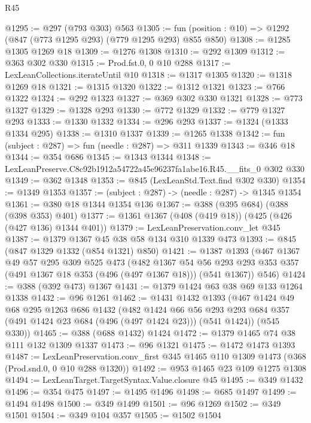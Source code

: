 \begin{lexlean}{R45}
\begin{coremodule}
@1295 := @297 (@793 @303) @563
@1305 := fun (position : @10) => @1292 (@847 (@773 @1295 @293) (@779 @1295 @293) @855 @850)
@1308 := @1285 @1305 @1269 @18
@1309 := @1276 @1308
@1310 := @292 @1309
@1312 := @363 @302 @330
@1315 := Prod.fst.{0, 0} @10 @288
@1317 := LexLeanCollections.iterateUntil @10
@1318 := @1317 @1305
@1320 := @1318 @1269 @18
@1321 := @1315 @1320
@1322 := @1312 @1321
@1323 := @766 @1322
@1324 := @292 @1323
@1327 := @369 @302 @330 @1321
@1328 := @773 @1327
@1329 := @1328 @293
@1330 := @772 @1329
@1332 := @779 @1327 @293
@1333 := @1330 @1332
@1334 := @296 @293
@1337 := @1324 (@1333 @1334 @295)
@1338 := @1310 @1337
@1339 := @1265 @1338
@1342 := fun (subject : @287) => fun (needle : @287) => @311 @1339
@1343 := @346 @18
@1344 := @354 @686
@1345 := @1343 @1344
@1348 := LexLeanPreserve.C8c92b1912a54722a45e96237fa1abe16.R45.__fits_0 @302 @330
@1349 := @362 @1348
@1353 := @845 (LexLeanStd.Text.find @302 @330)
@1354 := @1349 @1353
@1357 := (subject : @287) -> (needle : @287) -> @1345 @1354
@1361 := @380 @18 @1344 @1354 @136
@1367 := @388 (@395 @684) (@388 (@398 @353) @401)
@1377 := @1361 @1367 (@408 (@419 @18)) (@425 (@426 (@427 @136) @1344 @401))
@1379 := LexLeanPreservation.conv_let @345
@1387 := @1379 @1367 @45 @38 @58 @134 @310 @1339 @473
@1393 := @845 (@847 @1329 @1332 (@854 @1321) @850)
@1421 := @1387
    @1393
    (@467
      @1367
      @49
      @57
      @295
      @309
      @525
      @473
      (@482
        @1367
        @54
        @56
        @293
        @293
        @353
        @357
        (@491 @1367 @18 @353 (@496 (@497 @1367 @18)))
        (@541 @1367))
      @546)
@1424 := @388 (@392 @473) @1367
@1431 := @1379 @1424 @63 @38 @69 @133 @1264 @1338
@1432 := @96 @1261
@1462 := @1431
    @1432
    @1393
    (@467
      @1424
      @49
      @68
      @295
      @1263
      @686
      @1432
      (@482
        @1424
        @66
        @56
        @293
        @293
        @684
        @357
        (@491 @1424 @23 @684 (@496 (@497 @1424 @23)))
        (@541 @1424))
      (@545 @330))
@1465 := @388 (@688 @1432) @1424
@1472 := @1379 @1465 @74 @38 @111 @132 @1309 @1337
@1473 := @96 @1321
@1475 := @1472 @1473 @1393
@1487 := LexLeanPreservation.conv_first
    @345
    @1465
    @110
    @1309
    @1473
    (@368 (Prod.snd.{0, 0} @10 @288 @1320))
@1492 := @953 @1465 @23 @109 @1275 @1308
@1494 := LexLeanTarget.TargetSyntax.Value.closure @45
@1495 := @349 @1432
@1496 := @354 @475
@1497 := @1495 @1496
@1498 := @685 @1497
@1499 := @1494 @1498
@1500 := @349 @1499
@1501 := @96 @1269
@1502 := @349 @1501
@1504 := @349 @104 @357
@1505 := @1502 @1504

\end{coremodule}
\end{lexlean}
